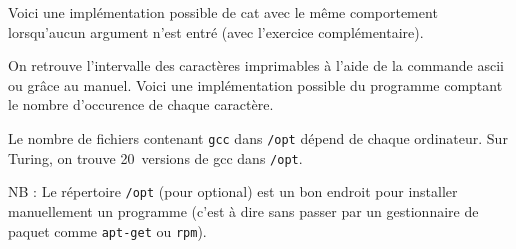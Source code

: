 \documentclass[10pt]{article}
\begin{document}
\begin{enumerate}[label=\textbf{[\alph*]}]
  

  \newpage

  Voici une implémentation possible de cat avec le même comportement
  lorsqu'aucun argument n'est entré (avec l'exercice complémentaire).

  

  \newpage

\item On retrouve l'intervalle des caractères imprimables à l'aide de
  la commande ascii ou grâce au manuel. Voici une implémentation
  possible du programme comptant le nombre d'occurence de chaque
  caractère.

  

  \newpage

\item Le nombre de fichiers contenant \texttt{gcc} dans \texttt{/opt}
  dépend de chaque ordinateur. Sur Turing, on trouve 20~versions de gcc
  dans \texttt{/opt}.

  \vspace{1em}

  NB : Le répertoire \texttt{/opt} (pour optional) est un bon endroit
  pour installer manuellement un programme (c'est à dire sans passer
  par un gestionnaire de paquet comme \texttt{apt-get} ou
  \texttt{rpm}).


\end{enumerate}
\end{document}
